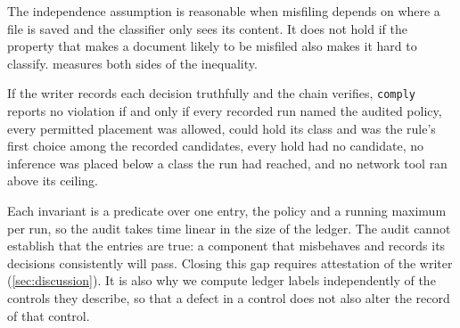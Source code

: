 The independence assumption is reasonable when misfiling depends on where a file is saved and
the classifier only sees its content. It does not hold if the property that makes a document
likely to be misfiled also makes it hard to classify.  measures both sides
of the inequality.

\begin{proposition}
\label{prop:audit}
If the writer records each decision truthfully and the chain verifies, \texttt{comply}
reports no violation if and only if every recorded run named the audited policy, every
permitted placement was allowed, could hold its class and was the rule's first choice among
the recorded candidates, every hold had no candidate, no inference was placed below a class
the run had reached, and no network tool ran above its ceiling.
\end{proposition}

Each invariant is a predicate over one entry, the policy and a running maximum per run, so the
audit takes time linear in the size of the ledger. The audit cannot establish that the entries
are true: a component that misbehaves and records its decisions consistently will pass. Closing
this gap requires attestation of the writer (\cref{sec:discussion}). It is also why we compute
ledger labels independently of the controls they describe, so that a defect in a control does
not also alter the record of that control.
